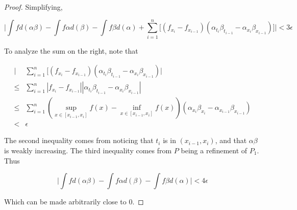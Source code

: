 \documentclass{amsart}
\begin{document}
\begin{proof}
Simplifying,

\[
\bigg|
\int f d(\alpha\beta) - \int f\alpha d(\beta) - \int f\beta d(\alpha) +
\sum_{i=1}^n \Big[
(f_{x_i} - f_{x_{i-1}}) (\alpha_{t_i}\beta_{t_{i-1}} - \alpha_{x_i}\beta_{x_{i-1}})
\Big] \bigg|
< 3\epsilon
\]

To analyze the sum on the right, note that

\begin{align*}
\bigg|
&\sum_{i=1}^n \Big[(f_{x_i} - f_{x_{i-1}}) (\alpha_{t_i}\beta_{t_{i-1}} - \alpha_{x_i}\beta_{x_{i-1}})
\bigg| \\
\leq &\sum_{i=1}^n \left|f_{x_i} - f_{x_{i-1}}\right| \left|\alpha_{t_i}\beta_{t_{i-1}} - \alpha_{x_i}\beta_{x_{i-1}}\right| \\
\leq &\sum_{i=1}^n \left(\sup_{x \in [x_{i-1}, x_i]} f(x) - \inf_{x \in [x_{i-1}, x_i]} f(x)\right)
\left(\alpha_{x_i}\beta_{x_i} - \alpha_{x_{i-1}}\beta_{x_{i-1}}\right) \\
< &\epsilon
\end{align*}

The second inequality comes from noticing that $t_i$ is in $(x_{i-1}, x_i)$, and that $\alpha\beta$ is weakly increasing. The third inequality comes from $P$ being a refinement of $P_1$. Thus

\[
\bigg| \int f d(\alpha\beta) - \int f\alpha d(\beta) - \int f\beta d(\alpha) \bigg|
< 4\epsilon
\]

Which can be made arbitrarily close to 0.

\end{proof}
\end{document}
